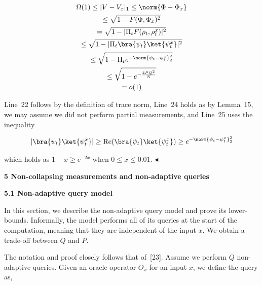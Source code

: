 \documentclass[10pt,a4paper]{article}
\begin{document}
\[\begin{gathered}
\displaystyle\Omega(1)\leq|V-V_{x}|_{1} \displaystyle\leq\norm{\Phi-\Phi_{x}} \\
\displaystyle\leq\sqrt{1-F(\Phi,\Phi_{x})^{2}} \\
\displaystyle=\sqrt{1-|\Pi_{t}F(\rho_{t},\rho_{t}^{x})|^{2}} \\
\displaystyle\leq\sqrt{1-|\Pi_{t}\bra{\psi_{t}}\ket{\psi_{t}^{x}}|^{2}} \\
\displaystyle\leq\sqrt{1-\Pi_{t}e^{-\norm{\psi_{t}-\psi_{t}^{x}}^{2}_{2}}} \\
\displaystyle\leq\sqrt{1-e^{-\frac{4PQ^{2}}{N}}} \\
\displaystyle=o(1)
\end{gathered}\]




Line 22 follows by the definition of trace norm, Line 24 holds as by Lemma 15, we may assume we did not perform partial measurements, and Line 25 uses the inequality\par


\[\begin{gathered}
\displaystyle|\bra{\psi_{t}}\ket{\psi_{t}^{x}}|\geq\text{Re}(\bra{\psi_{t}}\ket{\psi_{t}^{x}})\geq e^{-\norm{\psi_{t}-\psi_{t}^{x}}^{2}_{2}}
\end{gathered}\]


which holds as $1-x\geq e^{-2x}$ when $0\leq x\leq 0.01$.
$\blacktriangleleft$\par







\par\medskip\noindent\textbf{
5 Non-collapsing measurements and non-adaptive queries}\par




\par\medskip\noindent\textbf{
5.1 Non-adaptive query model}\par




In this section, we describe the non-adaptive query model and prove its lower-bounds. Informally, the model performs all of its queries at the start of the computation, meaning that they are independent of the input $x$. We obtain a trade-off between $Q$ and $P$.\par




The notation and proof closely follows that of [23]. Assume we perform $Q$ non-adaptive queries. Given an oracle operator $O_{x}$ for an input $x$, we define the query as,\par
\end{document}
